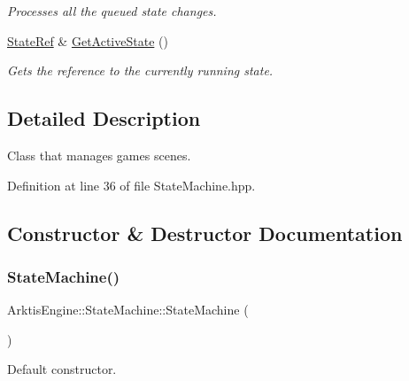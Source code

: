 \begin{DoxyCompactItemize}
\begin{DoxyCompactList}\small\item\em Processes all the queued state changes. \end{DoxyCompactList}\item 
\mbox{\hyperlink{namespace_arktis_engine_a2df871316f5a55f656d888e1ab2f4531}{State\+Ref}} \& \mbox{\hyperlink{class_arktis_engine_1_1_state_machine_adc32ec7490b802e3600dde4d9f793fb1}{Get\+Active\+State}} ()
\begin{DoxyCompactList}\small\item\em Gets the reference to the currently running state. \end{DoxyCompactList}\end{DoxyCompactItemize}


\subsection{Detailed Description}
Class that manages game\textquotesingle{}s scenes. 

\begin{DoxyVerb}\end{DoxyVerb}
 

Definition at line 36 of file State\+Machine.\+hpp.



\subsection{Constructor \& Destructor Documentation}
\mbox{\label{class_arktis_engine_1_1_state_machine_a1118386ad3a25318c596e7cd2973e653}} 
\subsubsection{\texorpdfstring{StateMachine()}{StateMachine()}}
{\footnotesize\ttfamily Arktis\+Engine\+::\+State\+Machine\+::\+State\+Machine (\begin{DoxyParamCaption}{ }\end{DoxyParamCaption})\hspace{0.3cm}{\ttfamily [inline]}}



Default constructor. 

